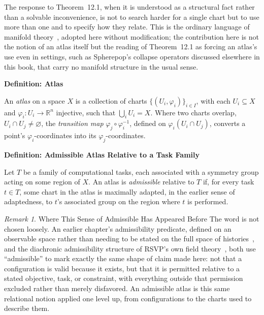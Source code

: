 \documentclass[11pt,fleqn]{book}
\numberwithin{equation}{chapter}
\newenvironment{definition}[1]
  {\begin{definitionEnv}
   \noindent\textbf{Definition: #1}\par\smallskip}
  {\end{definitionEnv}}
\theoremstyle{plain}
\theoremstyle{definition}
\theoremstyle{remark}
\newtheorem{remark}[theorem]{Remark}
\newcommand{\R}{\mathbb{R}}
\providecommand{\enquote}[1]{``#1''}
\begin{document}
The response to Theorem~12.1, when it is understood as a structural fact rather than a solvable inconvenience, is not to search harder for a single chart but to use more than one and to specify how they relate. This is the ordinary language of manifold theory~\cite{lee2012}, adopted here without modification; the contribution here is not the notion of an atlas itself but the reading of Theorem~12.1 as forcing an atlas's use even in settings, such as Spherepop's collapse operators discussed elsewhere in this book, that carry no manifold structure in the usual sense.

\begin{definition}{Atlas}
An \emph{atlas} on a space \(X\) is a collection of charts \(\{(U_i,\varphi_i)\}_{i\in I}\), with each \(U_i\subseteq X\) and \(\varphi_i:U_i\to\R^n\) injective, such that \(\bigcup_i U_i = X\). Where two charts overlap, \(U_i\cap U_j\neq\varnothing\), the \emph{transition map} \(\varphi_j\circ\varphi_i^{-1}\), defined on \(\varphi_i(U_i\cap U_j)\), converts a point's \(\varphi_i\)-coordinates into its \(\varphi_j\)-coordinates.
\end{definition}

\begin{definition}{Admissible Atlas Relative to a Task Family}
Let \(T\) be a family of computational tasks, each associated with a symmetry group acting on some region of \(X\). An atlas is \emph{admissible} relative to \(T\) if, for every task \(t\in T\), some chart in the atlas is maximally adapted, in the earlier sense of adaptedness, to \(t\)'s associated group on the region where \(t\) is performed.
\end{definition}

\begin{remark}{Where This Sense of Admissible Has Appeared Before}
The word is not chosen loosely. An earlier chapter's admissibility predicate, defined on an observable space rather than needing to be stated on the full space of histories~\cite{distinction-geometry}, and the diachronic admissibility structure of RSVP's own field theory~\cite{holonomic}, both use \enquote{admissible} to mark exactly the same shape of claim made here: not that a configuration is valid because it exists, but that it is permitted relative to a stated objective, task, or constraint, with everything outside that permission excluded rather than merely disfavored. An admissible atlas is this same relational notion applied one level up, from configurations to the charts used to describe them.
\end{remark}
\end{document}
